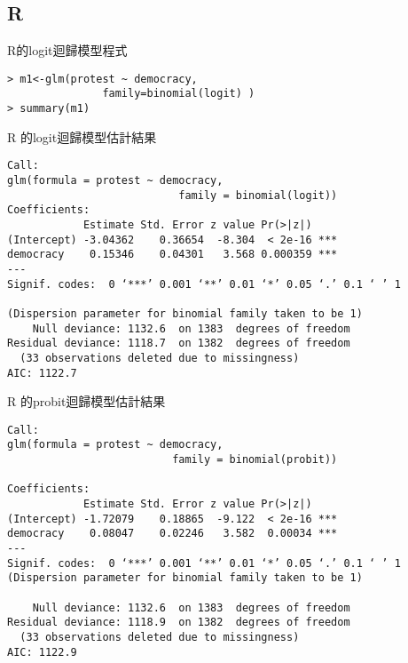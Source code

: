 \documentclass[border=10pt]{beamer}
\begin{document}
\subsection{R}
\begin{frame}[fragile=singleslide]{R的logit迴歸模型程式}
\begin{Verbatim}[label=\textit{R code}, formatcom=\color{yellow}, frame=single]
> m1<-glm(protest ~ democracy, 
	           family=binomial(logit) )
> summary(m1)
\end{Verbatim}
\end{frame}
\begin{frame}[fragile=singleslide]{R 的logit迴歸模型估計結果}
\small
\begin{Verbatim}[label=\textit{R output}, formatcom=\color{yellow}, frame=single]
Call:
glm(formula = protest ~ democracy, 
                           family = binomial(logit))
Coefficients:
            Estimate Std. Error z value Pr(>|z|)    
(Intercept) -3.04362    0.36654  -8.304  < 2e-16 ***
democracy    0.15346    0.04301   3.568 0.000359 ***
---
Signif. codes:  0 ‘***’ 0.001 ‘**’ 0.01 ‘*’ 0.05 ‘.’ 0.1 ‘ ’ 1

(Dispersion parameter for binomial family taken to be 1)
    Null deviance: 1132.6  on 1383  degrees of freedom
Residual deviance: 1118.7  on 1382  degrees of freedom
  (33 observations deleted due to missingness)
AIC: 1122.7
\end{Verbatim}
\end{frame}
\begin{frame}[fragile=singleslide]{R 的probit迴歸模型估計結果}
\small
\begin{Verbatim}[label=\textit{R output}, formatcom=\color{yellow}, frame=single]
Call:
glm(formula = protest ~ democracy, 
                          family = binomial(probit))

Coefficients:
            Estimate Std. Error z value Pr(>|z|)    
(Intercept) -1.72079    0.18865  -9.122  < 2e-16 ***
democracy    0.08047    0.02246   3.582  0.00034 ***
---
Signif. codes:  0 ‘***’ 0.001 ‘**’ 0.01 ‘*’ 0.05 ‘.’ 0.1 ‘ ’ 1
(Dispersion parameter for binomial family taken to be 1)

    Null deviance: 1132.6  on 1383  degrees of freedom
Residual deviance: 1118.9  on 1382  degrees of freedom
  (33 observations deleted due to missingness)
AIC: 1122.9
\end{Verbatim}
\end{frame}
\end{document}

